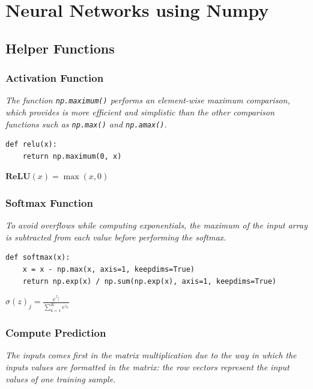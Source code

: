 \documentclass[letter]{article}
\begin{document}
\section{Neural Networks using Numpy}

\subsection{Helper Functions}

\subsubsection{Activation Function}

\textit{The function \texttt{np.maximum()} performs an element-wise maximum comparison, which provides is more efficient and simplistic than the other comparison functions such as \texttt{np.max()} and \texttt{np.amax()}.}

\begin{lstlisting}
def relu(x):
    return np.maximum(0, x)
\end{lstlisting}

$\textbf{ReLU}(x) = \max(x, 0)$ \\

\subsubsection{Softmax Function}

\textit{To avoid overflows while computing exponentials, the maximum of the input array is subtracted from each value before performing the softmax.}

\begin{lstlisting}
def softmax(x):
    x = x - np.max(x, axis=1, keepdims=True)
    return np.exp(x) / np.sum(np.exp(x), axis=1, keepdims=True)
\end{lstlisting}

$\sigma(z)_j = \frac{e^{z_j}}{\sum_{k = 1}^K e^{z_k}}$ \\

\subsubsection{Compute Prediction}

\textit{The inputs comes first in the matrix multiplication due to the way in which the inputs values are formatted in the matrix: the row vectors represent the input values of one training sample.}
\end{document}
